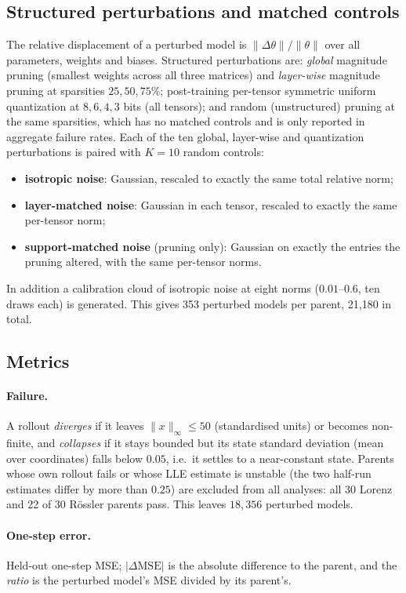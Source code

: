 \documentclass[11pt]{article}
\newcommand{\relnorm}{\|\Delta\theta\|/\|\theta\|}
\begin{document}
\subsection{Structured perturbations and matched controls}
The relative displacement of a perturbed model is $\relnorm$ over all parameters, weights and biases. Structured perturbations are: \emph{global} magnitude pruning (smallest weights across all three matrices) and \emph{layer-wise} magnitude pruning at sparsities $25,50,75\%$; post-training per-tensor symmetric uniform quantization at $8,6,4,3$ bits (all tensors); and random (unstructured) pruning at the same sparsities, which has no matched controls and is only reported in aggregate failure rates. Each of the ten global, layer-wise and quantization perturbations is paired with $K=10$ random controls:
\begin{itemize}
\item \textbf{isotropic noise}: Gaussian, rescaled to exactly the same total relative norm;
\item \textbf{layer-matched noise}: Gaussian in each tensor, rescaled to exactly the same per-tensor norm;
\item \textbf{support-matched noise} (pruning only): Gaussian on exactly the entries the pruning altered, with the same per-tensor norms.
\end{itemize}
In addition a calibration cloud of isotropic noise at eight norms ($0.01$--$0.6$, ten draws each) is generated. This gives 353 perturbed models per parent, 21{,}180 in total.

\subsection{Metrics}
\paragraph{Failure.} A rollout \emph{diverges} if it leaves $\|x\|_\infty\le 50$ (standardised units) or becomes non-finite, and \emph{collapses} if it stays bounded but its state standard deviation (mean over coordinates) falls below $0.05$, i.e.\ it settles to a near-constant state. Parents whose own rollout fails or whose LLE estimate is unstable (the two half-run estimates differ by more than $0.25$) are excluded from all analyses: all 30 Lorenz and 22 of 30 R\"ossler parents pass. This leaves $18{,}356$ perturbed models.

\paragraph{One-step error.} Held-out one-step MSE; $|\Delta\mathrm{MSE}|$ is the absolute difference to the parent, and the \emph{ratio} is the perturbed model's MSE divided by its parent's.
\end{document}
